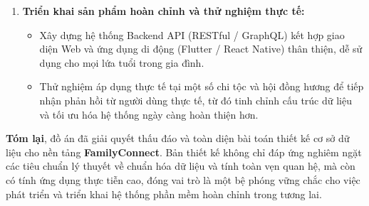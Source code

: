 \begin{enumerate}[leftmargin=*]
    \item \textbf{Triển khai sản phẩm hoàn chỉnh và thử nghiệm thực tế:}
    \begin{itemize}
        \item Xây dựng hệ thống Backend API (RESTful / GraphQL) kết hợp giao diện Web và ứng dụng di động (Flutter / React Native) thân thiện, dễ sử dụng cho mọi lứa tuổi trong gia đình.
        \item Thử nghiệm áp dụng thực tế tại một số chi tộc và hội đồng hương để tiếp nhận phản hồi từ người dùng thực tế, từ đó tinh chỉnh cấu trúc dữ liệu và tối ưu hóa hệ thống ngày càng hoàn thiện hơn.
    \end{itemize}
\end{enumerate}

\bigskip
\noindent
\textbf{Tóm lại}, đồ án đã giải quyết thấu đáo và toàn diện bài toán thiết kế cơ sở dữ liệu cho nền tảng \textbf{FamilyConnect}. Bản thiết kế không chỉ đáp ứng nghiêm ngặt các tiêu chuẩn lý thuyết về chuẩn hóa dữ liệu và tính toàn vẹn quan hệ, mà còn có tính ứng dụng thực tiễn cao, đóng vai trò là một bệ phóng vững chắc cho việc phát triển và triển khai hệ thống phần mềm hoàn chỉnh trong tương lai.
